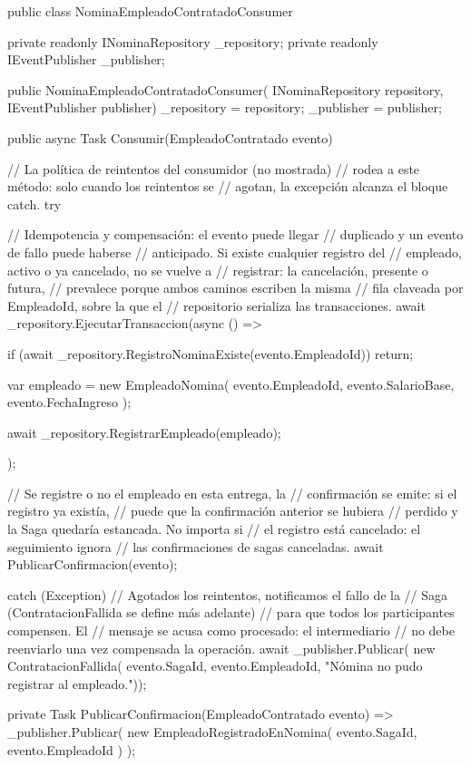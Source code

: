\documentclass[12pt, a4paper]{article}
\begin{document}
    \begin{csharpbox}
public class NominaEmpleadoContratadoConsumer
{
    private readonly INominaRepository _repository;
    private readonly IEventPublisher _publisher;

    public NominaEmpleadoContratadoConsumer(
        INominaRepository repository,
        IEventPublisher publisher)
    {
        _repository = repository;
        _publisher = publisher;
    }

    public async Task Consumir(EmpleadoContratado evento)
    {
        // La política de reintentos del consumidor (no mostrada)
        // rodea a este método: solo cuando los reintentos se
        // agotan, la excepción alcanza el bloque catch.
        try
        {
            // Idempotencia y compensación: el evento puede llegar
            // duplicado y un evento de fallo puede haberse
            // anticipado. Si existe cualquier registro del
            // empleado, activo o ya cancelado, no se vuelve a
            // registrar: la cancelación, presente o futura,
            // prevalece porque ambos caminos escriben la misma
            // fila claveada por EmpleadoId, sobre la que el
            // repositorio serializa las transacciones.
            await _repository.EjecutarTransaccion(async () =>
            {
                if (await _repository.RegistroNominaExiste(evento.EmpleadoId))
                    return;

                var empleado = new EmpleadoNomina(
                    evento.EmpleadoId,
                    evento.SalarioBase,
                    evento.FechaIngreso
                );

                await _repository.RegistrarEmpleado(empleado);
            });

            // Se registre o no el empleado en esta entrega, la
            // confirmación se emite: si el registro ya existía,
            // puede que la confirmación anterior se hubiera
            // perdido y la Saga quedaría estancada. No importa si
            // el registro está cancelado: el seguimiento ignora
            // las confirmaciones de sagas canceladas.
            await PublicarConfirmacion(evento);
        }
        catch (Exception)
        {
            // Agotados los reintentos, notificamos el fallo de la
            // Saga (ContratacionFallida se define más adelante)
            // para que todos los participantes compensen. El
            // mensaje se acusa como procesado: el intermediario
            // no debe reenviarlo una vez compensada la operación.
            await _publisher.Publicar(
                new ContratacionFallida(
                    evento.SagaId,
                    evento.EmpleadoId,
                    "Nómina no pudo registrar al empleado."));
        }
    }

    private Task PublicarConfirmacion(EmpleadoContratado evento) =>
        _publisher.Publicar(
            new EmpleadoRegistradoEnNomina(
                evento.SagaId,
                evento.EmpleadoId
            )
        );
}
    \end{csharpbox}
\end{document}
